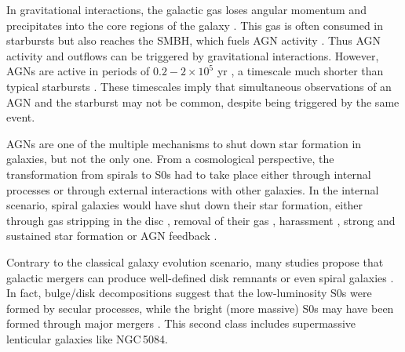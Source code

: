 \documentclass[modern]{aastex631}
\begin{document}
In gravitational interactions, the galactic gas loses angular momentum and precipitates into the core regions of the galaxy \citep{hopkins+2009apj691_1168}. This gas is often consumed in starbursts but also reaches the SMBH, which fuels AGN activity \citep{dimatteo+2005nat433_604, springel+2005mnras361_776}. Thus AGN activity and outflows can be triggered by gravitational interactions. However, AGNs are active in periods of $0.2-2\times10^{5}$ yr \citep{keel+2012mnras420_878}, a timescale much shorter than typical starbursts \citep[$\tau=10^{7}$ yr,][]{heckman+1993inproceedings_455}. These timescales imply that simultaneous observations of an AGN and the starburst may not be common, despite being triggered by the same event. 

AGNs are one of the multiple mechanisms to shut down star formation in galaxies, but not the only one. From a cosmological perspective, the transformation from spirals to S0s had to take place either through internal processes or through external interactions with other galaxies. In the internal scenario, spiral galaxies would have shut down their star formation, either through gas stripping in the disc \citep{laurikainen+2010mnras405_1089}, removal of their gas \citep[starvation or strangulation,][]{larson+1980apj237_692}, harassment \citep{moore+1996nat379_613}, strong and sustained star formation \citep{kormendy+2004araa42_603} or AGN feedback \citep{chen+2020apj897_102}. \par 

Contrary to the classical galaxy evolution scenario, many studies propose that galactic mergers can produce well-defined disk remnants \citep{hopkins+2013mnras430_1901,elichemoral+2018aap617_113} or even spiral galaxies \citep{athanassoula+2016apj821_90,peschken+2017mnras468_994}. In fact, bulge/disk decompositions suggest that the low-luminosity S0s were formed by secular processes, while the bright (more massive) S0s may have been formed through major mergers \citep{barway+2009mnras394_1991,frasermckelvie+2018mnras481_5580}. This second class includes supermassive lenticular galaxies like NGC\,5084.\par 
\end{document}

